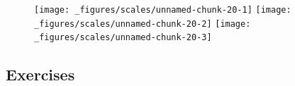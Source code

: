 \begin{Shaded}
\begin{Highlighting}[]
\StringTok{ }\NormalTok{(} \NormalTok{:}\NormalTok{)}
\StringTok{ }\NormalTok{)) +}\StringTok{ }\NormalTok{(}\NormalTok{(}  \NormalTok{)}
\StringTok{ }\NormalTok{(} \NormalTok{(}\NormalTok{, }\NormalTok{))}
\StringTok{ }\NormalTok{(} \NormalTok{(}\NormalTok{, }\NormalTok{), } 
\end{Highlighting}
\end{Shaded}

\begin{figure}[H]
  \centering
  \texttt{[image: \_figures/scales/unnamed-chunk-20-1]}%
  \texttt{[image: \_figures/scales/unnamed-chunk-20-2]}%
  \texttt{[image: \_figures/scales/unnamed-chunk-20-3]}
\end{figure}

\subsection{Exercises}

